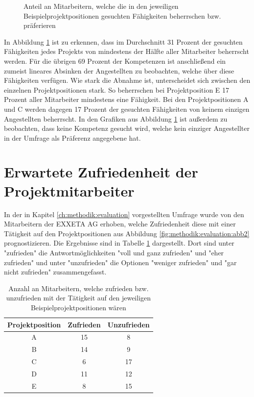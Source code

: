 \begin{figure}[h]
	\caption{Anteil an Mitarbeitern, welche die in den jeweiligen Beispielprojektpositionen gesuchten Fähigkeiten beherrschen bzw. präferieren}
	\label{fig:ergebnisse:analyse:abb6}
\end{figure}

In Abbildung \ref{fig:ergebnisse:analyse:abb6} ist zu erkennen, dass im Durchschnitt 31 Prozent der gesuchten Fähigkeiten jedes Projekts von mindestens der Hälfte aller Mitarbeiter beherrscht werden. Für die übrigen 69 Prozent der Kompetenzen ist anschließend ein zumeist lineares Absinken der Angestellten zu beobachten, welche über diese Fähigkeiten verfügen. Wie stark die Abnahme ist, unterscheidet sich zwischen den einzelnen Projektpositionen stark. So beherrschen bei Projektposition E 17 Prozent aller Mitarbeiter mindestens eine Fähigkeit. Bei den Projektpositionen A und C werden dagegen 17 Prozent der gesuchten Fähigkeiten von keinem einzigen Angestellten beherrscht. In den Grafiken aus Abbildung \ref{fig:ergebnisse:analyse:abb6} ist außerdem zu beobachten, dass keine Kompetenz gesucht wird, welche kein einziger Angestellter in der Umfrage als Präferenz angegebene hat.

\section{Erwartete Zufriedenheit der Projektmitarbeiter}
\label{ch:ergebnisse:umfrageMitarbeiter}
In der in Kapitel \ref{ch:methodik:evaluation} vorgestellten Umfrage wurde von den Mitarbeitern der EXXETA AG erhoben, welche Zufriedenheit diese mit einer Tätigkeit auf den Projektpositionen aus Abbildung \ref{fig:methodik:evaluation:abb2} prognostizieren. Die Ergebnisse sind in Tabelle \ref{tbl:ergebnisse:umfrageMitarbeiter:zufriedenheit:tbl1} dargestellt. Dort sind unter "zufrieden" die Antwortmöglichkeiten "voll und ganz zufrieden" und "eher zufrieden" und unter "unzufrieden" die Optionen "weniger zufrieden" und "gar nicht zufrieden" zusammengefasst.

\begin{table}[h]
	\centering
	\begin{tabular}{c|c|c}
		\textbf{Projektposition} & \textbf{Zufrieden} & \textbf{Unzufrieden}\\ 
		\hline
		A & 15 & 8\\
		B & 14 & 9\\
		C & 6  & 17\\
		D & 11 & 12\\
		E & 8  & 15
	\end{tabular}
	\caption{Anzahl an Mitarbeitern, welche zufrieden bzw. unzufrieden mit der Tätigkeit auf den jeweiligen Beispielprojektpositionen wären}
	\label{tbl:ergebnisse:umfrageMitarbeiter:zufriedenheit:tbl1}
\end{table}

